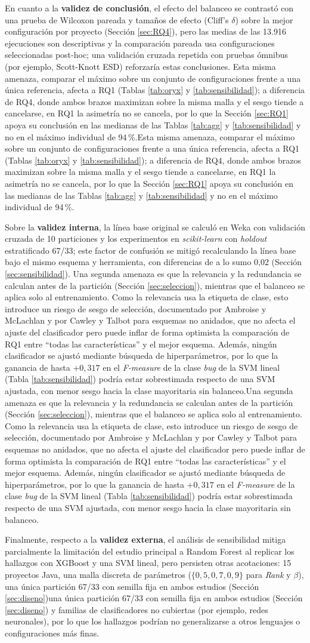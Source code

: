 \documentclass[conference,a4paper]{IEEEtran}
\newif\ifmarcarcambios
\newcommand{\cambio}[1]{\ifmarcarcambios\ifvmode\leavevmode\fi{\color{azulcambio}#1}\else#1\fi}
\begin{document}
En cuanto a la \textbf{validez de conclusión}, el efecto del balanceo se contrastó con una prueba de Wilcoxon pareada y tamaños de efecto (Cliff's $\delta$) sobre la mejor configuración por proyecto (Sección \ref{sec:RQ4}), pero las medias de las 13.916 ejecuciones son descriptivas y la comparación pareada usa configuraciones seleccionadas post-hoc; una validación cruzada repetida con pruebas ómnibus (por ejemplo, Scott-Knott ESD) reforzaría estas conclusiones. \cambio{Esta misma amenaza, comparar el máximo sobre un conjunto de configuraciones frente a una única referencia, afecta a RQ1 (Tablas \ref{tab:oryx} y \ref{tab:sensibilidad}); a diferencia de RQ4, donde ambos brazos maximizan sobre la misma malla y el sesgo tiende a cancelarse, en RQ1 la asimetría no se cancela, por lo que la Sección \ref{sec:RQ1} apoya su conclusión en las medianas de las Tablas \ref{tab:agg} y \ref{tab:sensibilidad} y no en el máximo individual de 94\,\%.}

Sobre la \textbf{validez interna}, la línea base original se calculó en Weka con validación cruzada de 10 particiones y los experimentos en \textit{scikit-learn} con \textit{holdout} estratificado 67/33; este factor de confusión se mitigó recalculando la línea base bajo el mismo esquema y herramienta, con diferencias de a lo sumo 0,02 (Sección \ref{sec:sensibilidad}). \cambio{Una segunda amenaza es que la relevancia y la redundancia se calculan antes de la partición (Sección \ref{sec:seleccion}), mientras que el balanceo se aplica solo al entrenamiento. Como la relevancia usa la etiqueta de clase, esto introduce un riesgo de sesgo de selección, documentado por Ambroise y McLachlan \cite{ambroise2002} y por Cawley y Talbot \cite{cawley2010} para esquemas no anidados, que no afecta el ajuste del clasificador pero puede inflar de forma optimista la comparación de RQ1 entre ``todas las características'' y el mejor esquema. Además, ningún clasificador se ajustó mediante búsqueda de hiperparámetros, por lo que la ganancia de hasta $+0{,}317$ en el \textit{F-measure} de la clase \textit{bug} de la SVM lineal (Tabla \ref{tab:sensibilidad}) podría estar sobrestimada respecto de una SVM ajustada, con menor sesgo hacia la clase mayoritaria sin balanceo.}

Finalmente, respecto a la \textbf{validez externa}, el análisis de sensibilidad mitiga parcialmente la limitación del estudio principal a Random Forest al replicar los hallazgos con XGBoost y una SVM lineal, pero persisten otras acotaciones: 15 proyectos Java, una malla discreta de parámetros ($\{0{,}5, 0{,}7, 0{,}9\}$ para \textit{Rank} y $\beta$), \cambio{una única partición 67/33 con semilla fija en ambos estudios (Sección \ref{sec:diseno})} y familias de clasificadores no cubiertas (por ejemplo, redes neuronales), por lo que los hallazgos podrían no generalizarse a otros lenguajes o configuraciones más finas.
\end{document}
